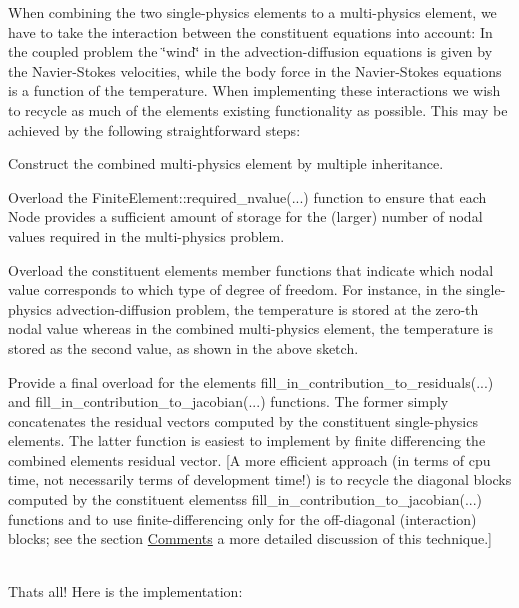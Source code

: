 When combining the two single-\/physics elements to a multi-\/physics element, we have to take the interaction between the constituent equations into account\+: In the coupled problem the \char`\"{}wind\char`\"{} in the advection-\/diffusion equations is given by the Navier-\/\+Stokes velocities, while the body force in the Navier-\/\+Stokes equations is a function of the temperature. When implementing these interactions we wish to recycle as much of the elements\textquotesingle{} existing functionality as possible. This may be achieved by the following straightforward steps\+:
\begin{DoxyEnumerate}
\item Construct the combined multi-\/physics element by multiple inheritance. ~\newline
~\newline

\item Overload the {\ttfamily Finite\+Element\+::required\+\_\+nvalue}(...) function to ensure that each {\ttfamily Node} provides a sufficient amount of storage for the (larger) number of nodal values required in the multi-\/physics problem. ~\newline
~\newline

\item Overload the constituent element\textquotesingle{}s member functions that indicate which nodal value corresponds to which type of degree of freedom. For instance, in the single-\/physics advection-\/diffusion problem, the temperature is stored at the zero-\/th nodal value whereas in the combined multi-\/physics element, the temperature is stored as the second value, as shown in the above sketch. ~\newline
~\newline

\item Provide a final overload for the element\textquotesingle{}s {\ttfamily fill\+\_\+in\+\_\+contribution\+\_\+to\+\_\+residuals}(...) and {\ttfamily fill\+\_\+in\+\_\+contribution\+\_\+to\+\_\+jacobian}(...) functions. The former simply concatenates the residual vectors computed by the constituent single-\/physics elements. The latter function is easiest to implement by finite differencing the combined element\textquotesingle{}s residual vector. \mbox{[}A more efficient approach (in terms of cpu time, not necessarily terms of development time!) is to recycle the diagonal blocks computed by the constituent elements\textquotesingle{}s {\ttfamily fill\+\_\+in\+\_\+contribution\+\_\+to\+\_\+jacobian}(...) functions and to use finite-\/differencing only for the off-\/diagonal (interaction) blocks; see the section \hyperlink{index_comments}{Comments} a more detailed discussion of this technique.\mbox{]} ~\newline
~\newline

\end{DoxyEnumerate}That\textquotesingle{}s all! Here is the implementation\+:

